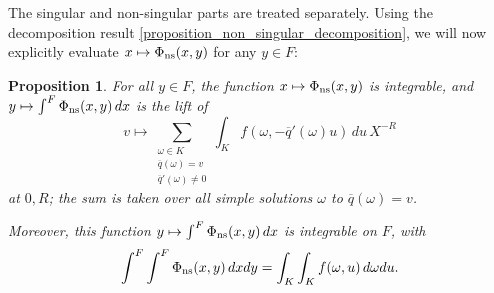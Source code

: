 \documentclass{lmsMODIFIED}
\newtheorem{proposition}[theorem]{Proposition}
\newcommand{\res}[1]{\overline{#1}}
\newcommand{\w}{\omega}
\newcommand{\sub}[1]{{\mbox{\scriptsize {#1}}}}
\begin{document}
The singular and non-singular parts are treated separately. Using the decomposition result \ref{proposition_non_singular_decomposition}, we will now explicitly evaluate $x\mapsto\Phi_\sub{ns}(x,y)$ for any $y\in F$:

\begin{proposition}
For all $y\in F$, the function $x\mapsto\Phi_\sub{ns}(x,y)$ is integrable, and $y\mapsto \int^F\Phi_\sub{ns}(x,y)\,dx$ is the lift of \[v\mapsto \sum_{\substack{\w\in K  \\\res{q}(\w)=v \\ \res{q}'(\w)\neq 0}} \int_K f(\w,-\res{q}'(\w)u)\,du\,X^{-R}\] at $0,R$; the sum is taken over all simple solutions $\w$ to $\res{q}(\w)=v$.

Moreover, this function $y\mapsto \int^F\Phi_\sub{ns}(x,y)\,dx$ is integrable on $F$, with \[\int^F\int^F\Phi_\sub{ns}(x,y)\,dxdy=\int_K\int_K f(\w,u)\,d\w du.\]
\end{proposition}
\end{document}
